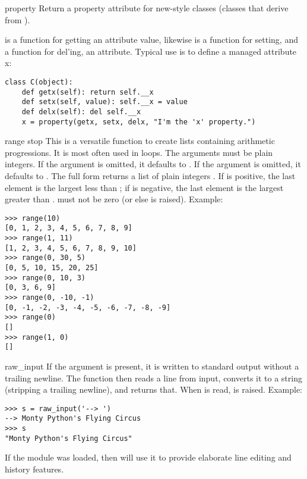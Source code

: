 \begin{funcdesc}{property}{}
  Return a property attribute for new-style classes (classes that
  derive from ).

   is a function for getting an attribute value, likewise
   is a function for setting, and  a function
  for del'ing, an attribute.  Typical use is to define a managed attribute x:

\begin{verbatim}
class C(object):
    def getx(self): return self.__x
    def setx(self, value): self.__x = value
    def delx(self): del self.__x
    x = property(getx, setx, delx, "I'm the 'x' property.")
\end{verbatim}

\end{funcdesc}

\begin{funcdesc}{range}{ stop}
  This is a versatile function to create lists containing arithmetic
  progressions.  It is most often used in  loops.  The
  arguments must be plain integers.  If the  argument is
  omitted, it defaults to .  If the  argument is
  omitted, it defaults to .  The full form returns a list of
  plain integers .  If  is positive,
  the last element is the largest  less than ; if  is negative, the last
  element is the largest 
  greater than .   must not be zero (or else
   is raised).  Example:

\begin{verbatim}
>>> range(10)
[0, 1, 2, 3, 4, 5, 6, 7, 8, 9]
>>> range(1, 11)
[1, 2, 3, 4, 5, 6, 7, 8, 9, 10]
>>> range(0, 30, 5)
[0, 5, 10, 15, 20, 25]
>>> range(0, 10, 3)
[0, 3, 6, 9]
>>> range(0, -10, -1)
[0, -1, -2, -3, -4, -5, -6, -7, -8, -9]
>>> range(0)
[]
>>> range(1, 0)
[]
\end{verbatim}
\end{funcdesc}

\begin{funcdesc}{raw_input}{}
  If the  argument is present, it is written to standard output
  without a trailing newline.  The function then reads a line from input,
  converts it to a string (stripping a trailing newline), and returns that.
  When \EOF{} is read,  is raised. Example:

\begin{verbatim}
>>> s = raw_input('--> ')
--> Monty Python's Flying Circus
>>> s
"Monty Python's Flying Circus"
\end{verbatim}

  If the  module was loaded, then
   will use it to provide elaborate
  line editing and history features.
\end{funcdesc}

